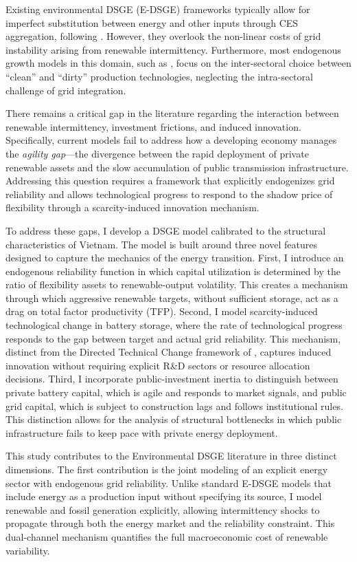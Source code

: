 \documentclass[12pt, a4paper]{article}
\begin{document}
Existing environmental DSGE (E-DSGE) frameworks typically allow for imperfect substitution between energy and other inputs through CES aggregation, following \citet{heutel2012}. However, they overlook the non-linear costs of grid instability arising from renewable intermittency. Furthermore, most endogenous growth models in this domain, such as \citet{acemoglu2012environment}, focus on the inter-sectoral choice between ``clean'' and ``dirty'' production technologies, neglecting the intra-sectoral challenge of grid integration.

There remains a critical gap in the literature regarding the interaction between renewable intermittency, investment frictions, and induced innovation. Specifically, current models fail to address how a developing economy manages the \textit{agility gap}---the divergence between the rapid deployment of private renewable assets and the slow accumulation of public transmission infrastructure. Addressing this question requires a framework that explicitly endogenizes grid reliability and allows technological progress to respond to the shadow price of flexibility through a scarcity-induced innovation mechanism.

To address these gaps, I develop a DSGE model calibrated to the structural characteristics of Vietnam. The model is built around three novel features designed to capture the mechanics of the energy transition. First, I introduce an endogenous reliability function in which capital utilization is determined by the ratio of flexibility assets to renewable-output volatility. This creates a mechanism through which aggressive renewable targets, without sufficient storage, act as a drag on total factor productivity (TFP). Second, I model scarcity-induced technological change in battery storage, where the rate of technological progress responds to the gap between target and actual grid reliability. This mechanism, distinct from the Directed Technical Change framework of \citet{acemoglu2002}, captures induced innovation without requiring explicit R\&D sectors or resource allocation decisions. Third, I incorporate public-investment inertia to distinguish between private battery capital, which is agile and responds to market signals, and public grid capital, which is subject to construction lags and follows institutional rules. This distinction allows for the analysis of structural bottlenecks in which public infrastructure fails to keep pace with private energy deployment.

This study contributes to the Environmental DSGE literature in three distinct dimensions. The first contribution is the joint modeling of an explicit energy sector with endogenous grid reliability. Unlike standard E-DSGE models that include energy as a production input without specifying its source, I model renewable and fossil generation explicitly, allowing intermittency shocks to propagate through both the energy market and the reliability constraint. This dual-channel mechanism quantifies the full macroeconomic cost of renewable variability.
\end{document}
